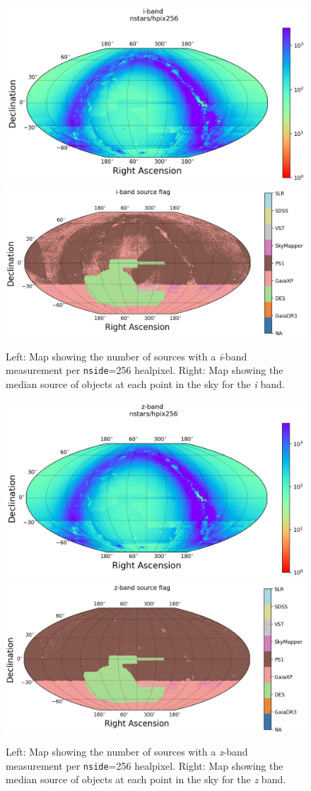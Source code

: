\begin{figure}
    \includegraphics[width=0.48\linewidth]{./figures/source_density_maps/i-band-counts-full.png}
    \includegraphics[width=0.48\linewidth]{./figures/source_survey_maps/i-band_source.png}
    \caption{Left: Map showing the number of sources with a \textit{i}-band measurement per \texttt{nside}=256 healpixel.
    Right: Map showing the median source of objects at each point in the sky for the \textit{i} band.}
    \label{fig:monster-i}
\end{figure}
\begin{figure}
    \includegraphics[width=0.48\linewidth]{./figures/source_density_maps/z-band-counts-full.png}
    \includegraphics[width=0.48\linewidth]{./figures/source_survey_maps/z-band_source.png}
    \caption{Left: Map showing the number of sources with a \textit{z}-band measurement per \texttt{nside}=256 healpixel.
    Right: Map showing the median source of objects at each point in the sky for the \textit{z} band.}
    \label{fig:monster-z}
\end{figure}
